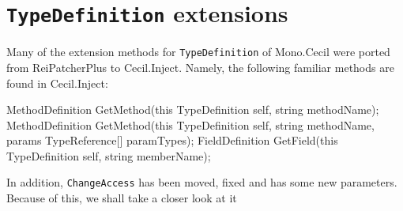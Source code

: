 \documentclass[a4paper,11pt]{article}
\newcommand{\CecilInject}{\textsc{C}{\scriptsize \sc ecil}.\textsc{I}{\scriptsize \sc nject}}
\begin{document}
\section{\texttt{TypeDefinition} extensions}
Many of the extension methods for \texttt{TypeDefinition} of Mono.Cecil were ported from ReiPatcherPlus to \CecilInject{}.
Namely, the following familiar methods are found in \CecilInject{}:
\begin{cs}
MethodDefinition GetMethod(this TypeDefinition self, string methodName);
MethodDefinition GetMethod(this TypeDefinition self,
                           string methodName,
                           params TypeReference[] paramTypes);
FieldDefinition GetField(this TypeDefinition self, string memberName);
\end{cs}
In addition, \texttt{ChangeAccess} has been moved, fixed and has some new parameters. Because of this, we shall take a closer look at it
\end{document}
